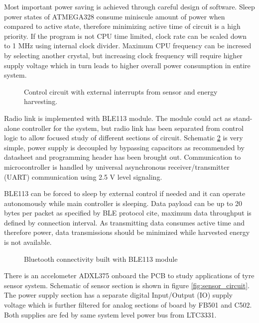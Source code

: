 Most important power saving is achieved through careful design of software. Sleep power states of ATMEGA328 consume miniscule amount of power when compared to active state, therefore minimizing active time of circuit is a high priority. If the program is not CPU time limited, clock rate can be scaled down to 1 MHz using internal clock divider. Maximum CPU frequency can be incresed by selecting another crystal, but increasing clock frequency will require higher supply voltage which in turn leads to higher overall power consumption in entire system.

\begin{figure}
    \centering
    \def\svgwidth{\columnwidth}
    
    \caption{\label{fig:atmega_circuit} Control circuit with external interrupts from sensor and energy harvesting.}
\end{figure}

Radio link is implemented with BLE113 module. The module could act as stand-alone controller for the system, but radio link has been separated from control logic to allow focused study of different sections of circuit.  Schematic  \ref{fig:bluetooth_circuit} is very simple, power supply is decoupled by bypassing capacitors as recommended by datasheet and programming header has been brought out. Communication to microcontroller is handled by universal asynchronous receiver/transmitter (UART) communication using 2.5 V level signaling. 

BLE113 can be forced to sleep by external control if needed and it can operate autonomously while main controller is sleeping. Data payload can be up to 20 bytes per packet as specified by BLE protocol {\color{red}cite}, maximum data throughput is defined by connection interval. As transmitting data consumes active time and therefore power, data transmissions should be minimized while harvested energy is not available.

\begin{figure}
    \centering
    \def\svgwidth{\columnwidth}
    
    \caption{\label{fig:bluetooth_circuit} Bluetooth connectivity built with BLE113 module}
\end{figure}

There is an accelometer ADXL375 onboard the PCB to study applications of tyre sensor system. Schematic of sensor section is shown in figure \ref{fig:sensor_circuit}. The power supply section has a separate digital Input/Output (IO) supply voltage which is further filtered for analog sections of board by FB501 and C502. Both supplies are fed by same system level power bus from LTC3331.


